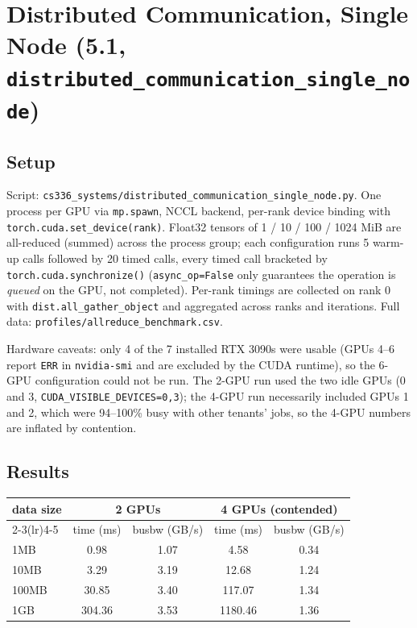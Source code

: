 \documentclass[11pt]{article}
\newcommand{\code}[1]{\texttt{#1}}
\begin{document}
\section{Distributed Communication, Single Node (5.1,
\texttt{distributed\_communication\_single\_node})}

\subsection{Setup}

Script: \code{cs336\_systems/distributed\_communication\_single\_node.py}. One process per GPU via
\code{mp.spawn}, NCCL backend, per-rank device binding with \code{torch.cuda.set\_device(rank)}.
Float32 tensors of 1 / 10 / 100 / 1024 MiB are all-reduced (summed) across the process group;
each configuration runs 5 warm-up calls followed by 20 timed calls, every timed call bracketed by
\code{torch.cuda.synchronize()} (\code{async\_op=False} only guarantees the operation is
\emph{queued} on the GPU, not completed). Per-rank timings are collected on rank 0 with
\code{dist.all\_gather\_object} and aggregated across ranks and iterations. Full data:
\code{profiles/allreduce\_benchmark.csv}.

Hardware caveats: only 4 of the 7 installed RTX 3090s were usable (GPUs 4--6 report
\texttt{ERR} in \code{nvidia-smi} and are excluded by the CUDA runtime), so the 6-GPU
configuration could not be run. The 2-GPU run used the two idle GPUs (0 and 3,
\code{CUDA\_VISIBLE\_DEVICES=0,3}); the 4-GPU run necessarily included GPUs 1 and 2, which were
94--100\% busy with other tenants' jobs, so the 4-GPU numbers are inflated by contention.

\subsection{Results}

\begin{center}\small
\begin{tabular}{lcccc}
\toprule
data size & \multicolumn{2}{c}{2 GPUs} & \multicolumn{2}{c}{4 GPUs (contended)} \\
\cmidrule(lr){2-3}\cmidrule(lr){4-5}
 & time (ms) & busbw (GB/s) & time (ms) & busbw (GB/s) \\
\midrule
1MB   & 0.98   & 1.07 & 4.58    & 0.34 \\
10MB  & 3.29   & 3.19 & 12.68   & 1.24 \\
100MB & 30.85  & 3.40 & 117.07  & 1.34 \\
1GB   & 304.36 & 3.53 & 1180.46 & 1.36 \\
\bottomrule
\end{tabular}
\end{center}
\end{document}
